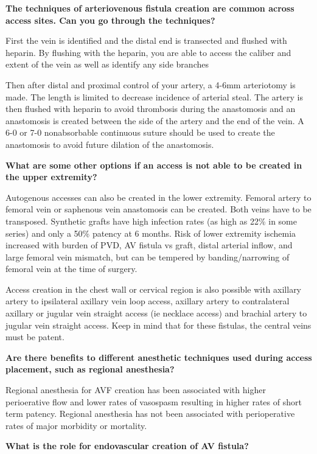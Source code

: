 \documentclass[
]{book}
\begin{document}
\textbf{The techniques of arteriovenous fistula creation are common across
access sites. Can you go through the techniques?}

First the vein is identified and the distal end is transected and
flushed with heparin. By flushing with the heparin, you are able to
access the caliber and extent of the vein as well as identify any side
branches

Then after distal and proximal control of your artery, a 4-6mm
arteriotomy is made. The length is limited to decrease incidence of
arterial steal. The artery is then flushed with heparin to avoid
thrombosis during the anastomosis and an anastomosis is created between
the side of the artery and the end of the vein. A 6-0 or 7-0
nonabsorbable continuous suture should be used to create the anastomosis
to avoid future dilation of the anastomosis.

\textbf{What are some other options if an access is not able to be created in
the upper extremity?}

Autogenous accesses can also be created in the lower extremity. Femoral
artery to femoral vein or saphenous vein anastomosis can be created.
Both veins have to be transposed. Synthetic grafts have high infection
rates (as high as 22\% in some series) and only a 50\% patency at 6
months.\citep{antoniou2009, lazarides2018, pike2019} Risk of lower
extremity ischemia increased with burden of PVD, AV fistula vs graft,
distal arterial inflow, and large femoral vein mismatch, but can be
tempered by banding/narrowing of femoral vein at the time of
surgery.\citep{antoniou2009, bourquelot2012, gradman2005}

Access creation in the chest wall or cervical region is also possible
with axillary artery to ipsilateral axillary vein loop access, axillary
artery to contralateral axillary or jugular vein straight access (ie
necklace access) and brachial artery to jugular vein straight access.
Keep in mind that for these fistulas, the central veins must be patent.

\textbf{Are there benefits to different anesthetic techniques used during
access placement, such as regional anesthesia?}

Regional anesthesia for AVF creation has been associated with higher
perioerative flow and lower rates of vasospasm resulting in higher rates
of short term patency. Regional anesthesia has not been associated with
perioperative rates of major morbidity or mortality.\citep{aitken2016, siracuse2014}

\textbf{What is the role for endovascular creation of AV fistula?}
\end{document}
